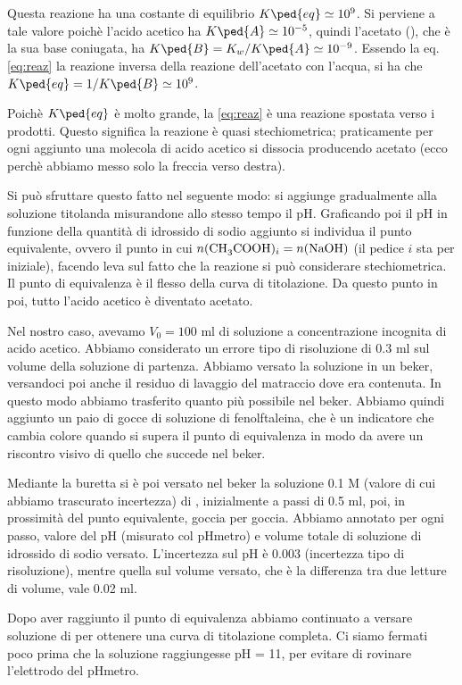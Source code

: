 Questa reazione ha una costante di equilibrio $K\ped{eq} \simeq 10^9$. Si perviene a tale valore poichè l'acido acetico ha $K\ped{A} \simeq 10^{-5}$,
quindi l'acetato (), che è la sua base coniugata, ha $K\ped{B} = K_w / K\ped{A} \simeq 10^{-9}$.
Essendo la eq. \eqref{eq:reaz} la reazione
inversa della reazione dell'acetato con l'acqua, si ha che $K\ped{eq} = 1/K\ped{B} \simeq 10^9$.

Poichè $K\ped{eq}$ è molto grande, la \eqref{eq:reaz} è una reazione spostata verso i prodotti. Questo significa la reazione
è quasi stechiometrica; praticamente per ogni  aggiunto una molecola di acido acetico si dissocia producendo acetato
(ecco perchè abbiamo messo solo la freccia verso destra).

Si può sfruttare questo fatto nel seguente modo: si aggiunge gradualmente  alla soluzione titolanda misurandone allo
stesso tempo il pH. Graficando poi il pH in funzione della quantità di idrossido di sodio aggiunto si individua
il punto equivalente, ovvero il punto in cui $n(\ce{CH3COOH})_i = n(\ce{NaOH})$ (il pedice $i$ sta per iniziale),
facendo leva sul fatto che la reazione si può considerare stechiometrica. Il punto di equivalenza è
il flesso della curva di titolazione. Da questo punto in poi, tutto l'acido acetico è diventato acetato.

Nel nostro caso, avevamo $V_0 = 100$ ml di soluzione a concentrazione incognita di acido acetico. Abbiamo
considerato un errore tipo di risoluzione di 0.3 ml sul volume della soluzione di partenza. Abbiamo versato la soluzione in un
beker, versandoci poi anche il residuo di lavaggio del matraccio dove era contenuta. In questo modo abbiamo
trasferito quanto più  possibile nel beker. Abbiamo quindi aggiunto un paio di gocce
di soluzione di fenolftaleina, che è un indicatore che cambia colore quando si supera il punto di equivalenza
in modo da avere un riscontro visivo di quello che succede nel beker.

Mediante la buretta si è poi versato nel beker la soluzione 0.1 M (valore di cui abbiamo trascurato incertezza)
di , inizialmente a
passi di 0.5 ml, poi, in prossimità del punto equivalente, goccia per goccia. Abbiamo annotato per ogni passo, valore
del pH (misurato col pHmetro) e volume totale di soluzione di idrossido di sodio versato. L'incertezza sul pH è 0.003
(incertezza tipo di risoluzione), mentre quella sul volume versato, che è la differenza tra due letture di volume,
vale 0.02 ml. 

Dopo aver raggiunto il punto di equivalenza abbiamo continuato a versare soluzione di  per
ottenere una curva di titolazione completa. Ci siamo fermati poco prima che la soluzione raggiungesse pH = 11,
per evitare di rovinare l'elettrodo del pHmetro.
